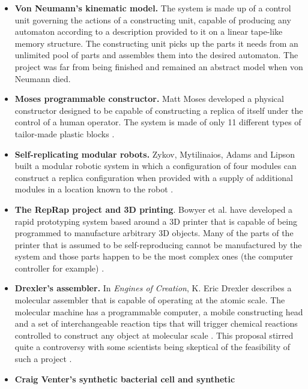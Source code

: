 \begin{itemize}
\item \textbf{Von Neumann’s kinematic model.} The system is made up of a
control unit governing the actions of a constructing unit, capable of
producing any automaton according to a description provided to it on a
linear tape-like memory structure. The constructing unit picks up the
parts it needs from an unlimited pool of parts and assembles them into
the desired automaton. The project was far from being finished and
remained an abstract model when von Neumann died.
\item \textbf{Moses{\textquotesingle} programmable constructor.} Matt Moses developed a physical constructor designed to be
capable of constructing a replica of itself under the control of a
human operator. The system is made of only 11 different types of
tailor-made plastic blocks \citep{moses2001}.
\item \textbf{Self-replicating modular robots.} Zykov, Mytilinaios,
Adams and Lipson built a modular robotic system in which a
configuration of four modules can construct a replica configuration
when provided with a supply of additional modules in a location known
to the robot \citep{zykovetal2005}.
\item \textbf{The RepRap project and 3D printing}. Bowyer et al.  have
developed a rapid prototyping system based around a 3D printer that is
capable of being programmed to manufacture arbitrary 3D objects. Many
of the parts of the printer that is assumed to be self-reproducing
cannot be manufactured by the system and those parts happen to be the
most complex ones (the computer controller for example) \citep{bowyer2007}.
\item \textbf{Drexler’s assembler.} In \textit{Engines of Creation}, K. Eric
Drexler describes a molecular assembler that is capable of operating at
the atomic scale. The molecular machine has a programmable computer, a
mobile constructing head and a set of interchangeable reaction tips
that will trigger chemical reactions controlled to construct any object
at molecular scale \citep{drexler1986}.
This proposal stirred quite a controversy with some
scientists being skeptical of the feasibility of such a project \citep{smalley2001}.
\item \textbf{Craig Venter’s synthetic bacterial cell and synthetic
}
\end{itemize}
